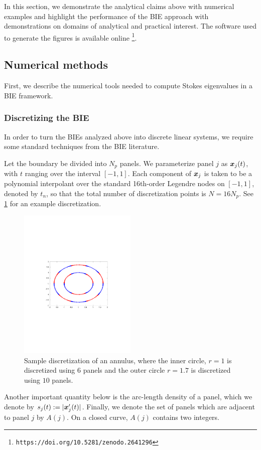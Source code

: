 In this section, we demonstrate the analytical
claims above with numerical examples and
highlight the performance of the BIE approach
with demonstrations on domains of analytical
and practical interest. The software used to
generate the figures is available online
\footnote{\texttt{https://doi.org/10.5281/zenodo.2641296}}.

\subsection{Numerical methods}

First, we describe the numerical tools needed
to compute Stokes eigenvalues in a BIE
framework.

\subsubsection{Discretizing the BIE}

In order to turn the BIEs analyzed
above into discrete linear systems,
we require some standard techniques
from the BIE literature.

Let the boundary be divided into $N_p$
panels.
%
We parameterize panel $j$ as
${\boldsymbol x}_j(t)$, with $t$ ranging over the
interval $[-1,1]$.
%
Each component of ${\boldsymbol x}_j$ is taken to be
a polynomial interpolant over the
standard 16th-order Legendre nodes on
$[-1,1]$, denoted by $t_n$, so that
the total number of discretization
points is $N=16N_p$.
%
See \cref{fig:panels} for an example
discretization.

\begin{figure}
\centering
\includegraphics[width=0.5\textwidth]{annulus_discretization.pdf}
\caption{Sample discretization of an annulus, where the inner
circle, $r=1$ is discretized using $6$ panels and the outer circle $r=1.7$
is discretized using $10$ panels.}
\label{fig:panels}
\end{figure}
%
Another important quantity below is the
arc-length density of a panel, which
we denote by $s_j(t) := |{\boldsymbol x}'_j(t)|$.
%
Finally, we denote the set of panels
which are adjacent to panel $j$
by $A(j)$. On a closed curve,
$A(j)$ contains two integers.

